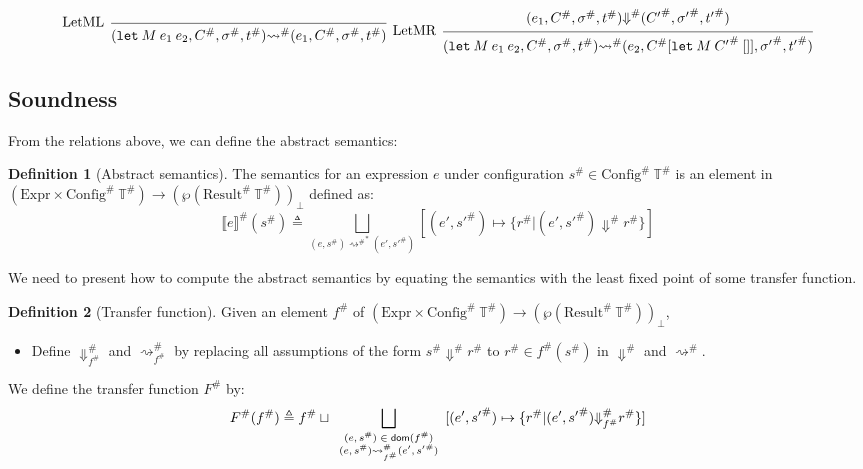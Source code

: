 \documentclass{article}
\theoremstyle{definition}
\newtheorem{definition}{Definition}[section]
\newcommand*{\A}[1]{{#1}^{\#}}
\newcommand*{\Expr}{\text{Expr}}
\newcommand*{\Time}{\mathbb{T}}
\newcommand*{\ATime}{\A{\Time}}
\newcommand*{\AConfig}[1]{\A{\text{Config}}\:{#1}}
\newcommand*{\AResult}[1]{\A{\text{Result}}\:{#1}}
\newcommand*{\sembracket}[1]{\lBrack{#1}\rBrack}
\begin{document}
\[
  \begin{prooftree}
    \infer[left label=LetML]0{
    (\mathtt{let}\:M\:e_{1}\:e_{2}, \A{C}, \A{\sigma}, \A{t})
    \A\rightsquigarrow
    (e_{1}, \A{C}, \A{\sigma}, \A{t})
    }
  \end{prooftree}\:\:
  \begin{prooftree}
    \hypo{
      \begin{matrix}
        (e_{1}, \A{C}, \A{\sigma}, \A{t})
        \A\Downarrow
        (\A{C'}, \A{\sigma'}, \A{t'})
      \end{matrix}
    }
    \infer[left label=LetMR]1{
    (\mathtt{let}\:M\:e_{1}\:e_{2}, \A{C}, \A{\sigma}, \A{t})
    \A\rightsquigarrow
    (e_{2}, \A{C}[\mathtt{let}\:M\:\A{C'}\:[]], \A{\sigma'}, \A{t'})
    }
  \end{prooftree}
\]

\subsection{Soundness}

From the relations above, we can define the abstract semantics:
\begin{definition}[Abstract semantics]
  The semantics for an expression $e$ under configuration $\A{s}\in\AConfig{\ATime}$ is an element in $(\Expr\times\AConfig{\ATime})\rightarrow(\wp(\AResult{\ATime}))_{\bot}$ defined as:
  \[
    \A{\sembracket{e}}(\A{s})\triangleq\bigsqcup_{(e,\A{s}){\A\rightsquigarrow}^{*}(e',\A{s'})}[(e',\A{s'})\mapsto\{\A{r}|(e',\A{s'})\A\Downarrow \A{r}\}]
  \]
\end{definition}

We need to present how to compute the abstract semantics by equating the semantics with the least fixed point of some transfer function.

\begin{definition}[Transfer function]
  Given an element $\A{f}$ of $(\Expr\times\AConfig{\ATime})\rightarrow(\wp(\AResult{\ATime}))_{\bot}$,

  \begin{itemize}
    \item Define $\A{\Downarrow}_{\A{f}}$ and $\A{\rightsquigarrow}_{\A{f}}$ by replacing all assumptions of the form $\A{s}\A\Downarrow\A{r}$ to $\A{r}\in\A{f}(\A{s})$ in $\A\Downarrow$ and $\A\rightsquigarrow$.
  \end{itemize}

  We define the transfer function $\A{F}$ by:
  \[
    \A{F}(\A{f})\triangleq\A{f}\sqcup\bigsqcup_{
      \scriptsize
      \begin{array}{c}
        (e,\A{s})\in\mathsf{dom}(\A{f})\\
        (e,\A{s})\A{\rightsquigarrow}_{\A{f}}(e',\A{s'})
      \end{array}}[(e',\A{s'})\mapsto\{\A{r}|(e',\A{s'})\A{\Downarrow}_{\A{f}}\A{r}\}]
  \]
\end{definition}
\end{document}
